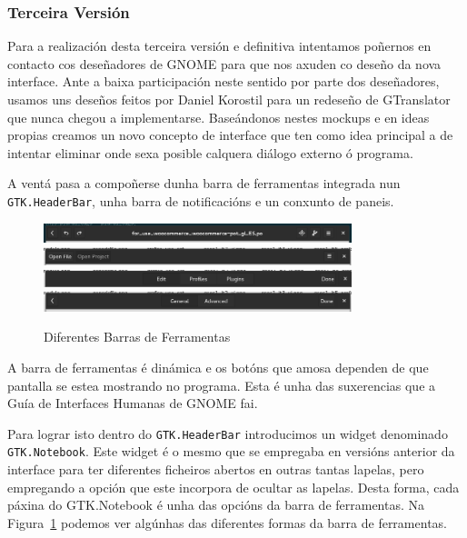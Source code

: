 \subsubsection{Terceira Versión}
Para a realización desta terceira versión e definitiva intentamos poñernos en contacto cos deseñadores de GNOME para que nos axuden co deseño da nova interface. Ante a baixa participación neste sentido por parte dos deseñadores, usamos uns deseños feitos por Daniel Korostil para un redeseño de GTranslator que nunca chegou a implementarse. Baseándonos nestes mockups e en ideas propias creamos un novo concepto de interface que ten como idea principal a de intentar eliminar onde sexa posible calquera diálogo externo ó programa.

A ventá pasa a compoñerse dunha barra de ferramentas integrada nun \lstinline{GTK.HeaderBar}, unha barra de notificacións e un conxunto de paneis.

\begin{figure}[h!]
  \centering
    \includegraphics[width=0.8\textwidth]{img/editheaderbar.png}
    \includegraphics[width=0.8\textwidth]{img/openedfilesheaderbar.png}
    \includegraphics[width=0.8\textwidth]{img/preferencesheaderbar.png}
    \includegraphics[width=0.8\textwidth]{img/profileheaderbar.png}
    \caption{Diferentes Barras de Ferramentas}
    \label{fig:ui:v3:headerbar}
\end{figure}

A barra de ferramentas é dinámica e os botóns que amosa dependen de que pantalla se estea mostrando no programa. Esta é unha das suxerencias que a Guía de Interfaces Humanas de GNOME fai.

Para lograr isto dentro do \lstinline{GTK.HeaderBar} introducimos un widget denominado \lstinline{GTK.Notebook}. Este widget é o mesmo que se empregaba en versións anterior da interface para ter diferentes ficheiros abertos en outras tantas lapelas, pero empregando a opción que este incorpora de ocultar as lapelas. Desta forma, cada páxina do GTK.Notebook é unha das opcións da barra de ferramentas. Na Figura~\ref{fig:ui:v3:headerbar} podemos ver algúnhas das diferentes formas da barra de ferramentas.

